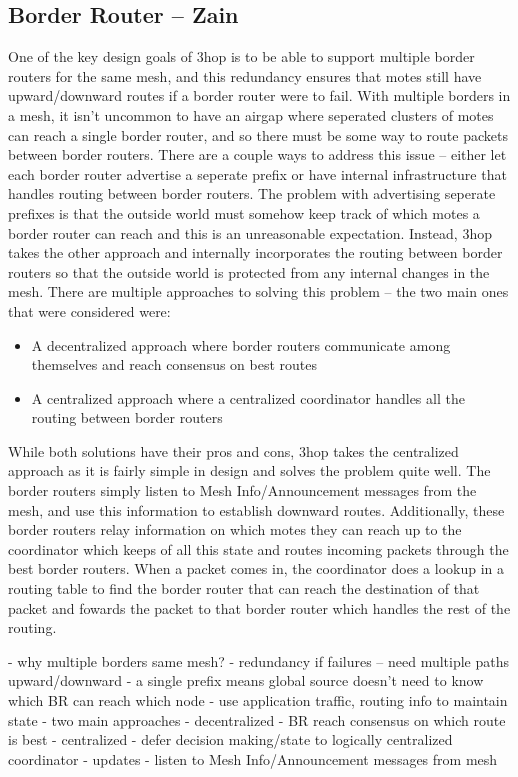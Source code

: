 \subsection{Border Router -- Zain}
One of the key design goals of 3hop is to be able to support multiple border routers for the same mesh, and this redundancy ensures that motes still have upward/downward routes if a border router were to fail.
With multiple borders in a mesh, it isn't uncommon to have an airgap where seperated clusters of motes can reach a single border router, and so there must be some way to route packets between border routers.
There are a couple ways to address this issue -- either let each border router advertise a seperate prefix or have internal infrastructure that handles routing between border routers.
The problem with advertising seperate prefixes is that the outside world must somehow keep track of which motes a border router can reach and this is an unreasonable expectation.
Instead, 3hop takes the other approach and internally incorporates the routing between border routers so that the outside world is protected from any internal changes in the mesh.
There are multiple approaches to solving this problem -- the two main ones that were considered were:
\begin{itemize}
\item A decentralized approach where border routers communicate among themselves and reach consensus on best routes
\item A centralized approach where a centralized coordinator handles all the routing between border routers 
\end{itemize}
While both solutions have their pros and cons, 3hop takes the centralized approach as it is fairly simple in design and solves the problem quite well.
The border routers simply listen to Mesh Info/Announcement messages from the mesh, and use this information to establish downward routes.
Additionally, these border routers relay information on which motes they can reach up to the coordinator which keeps of all this state and routes incoming packets through the best border routers.
When a packet comes in, the coordinator does a lookup in a routing table to find the border router that can reach the destination of that packet and fowards the packet to that border router which handles the rest of the routing.

\if
- why multiple borders same mesh?
    - redundancy if failures -- need multiple paths upward/downward
    - a single prefix means global source doesn't need to know which BR can reach which node
    - use application traffic, routing info to maintain state
- two main approaches
    - decentralized
        - BR reach consensus on which route is best
    - centralized
        - defer decision making/state to logically centralized coordinator
- updates
    - listen to Mesh Info/Announcement messages from mesh
\fi



